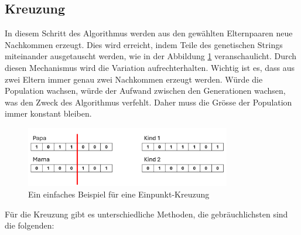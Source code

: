%
%
%
%
\subsection{Kreuzung
\label{buch:paper:varalg:subsection:crossover}}
In diesem Schritt des Algorithmus werden aus den gewählten Elternpaaren 
neue Nachkommen erzeugt. Dies wird erreicht, indem Teile des genetischen 
Strings miteinander ausgetauscht werden, 
wie in der Abbildung \ref{fig:one_point_crossover} veranschaulicht.
Durch diesen Mechanismus wird die Variation aufrechterhalten. Wichtig ist es,
dass aus zwei Eltern immer genau zwei Nachkommen erzeugt werden. Würde
die Population wachsen, würde der Aufwand zwischen den Generationen
wachsen, was den Zweck des Algorithmus verfehlt. Daher muss die Grösse der
Population immer konstant bleiben.
\begin{figure}
	\centering
	\includegraphics[width=0.8\textwidth]{
		papers/varalg/images/teil3/05GeneticStringCross.png
	}
	\caption{Ein einfaches Beispiel für eine Einpunkt-Kreuzung}
	\label{fig:one_point_crossover}
\end{figure}
Für die Kreuzung gibt es unterschiedliche Methoden, die gebräuchlichsten sind
die folgenden:
